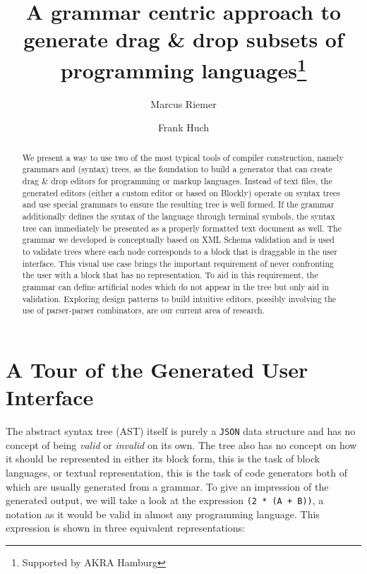 \documentclass[runningheads]{llncs}
\begin{document}
%
\title{A grammar centric approach to generate drag \& drop subsets of programming languages\thanks{Supported by AKRA Hamburg}}
%
%
\author{Marcus Riemer \and
Frank Huch}
%
%
%
\maketitle              %
%
\begin{abstract}
We present a way to use two of the most typical tools of compiler construction, namely grammars and (syntax) trees, as the foundation to build a generator that can create drag \& drop editors for programming or markup languages. Instead of text files, the generated editors (either a custom editor or based on Blockly) operate on syntax trees and use special grammars to ensure the resulting tree is well formed. If the grammar additionally defines the syntax of the language through terminal symbols, the syntax tree can immediately be presented as a properly formatted text document as well. The grammar we developed is conceptually based on XML Schema validation and is used to validate trees where each node corresponds to a block that is draggable in the user interface. This visual use case brings the important requirement of never confronting the user with a block that has no representation. To aid in this requirement, the grammar can define artificial nodes which do not appear in the tree but only aid in validation. Exploring design patterns to build intuitive editors, possibly involving the use of parser-parser combinators, are our current area of research.
\end{abstract}

\section{A Tour of the Generated User Interface}

The abstract syntax tree (AST) itself is purely a \texttt{JSON} data structure and has no concept of being \textit{valid} or \textit{invalid} on its own. The tree also has no concept on how it should be represented in either its block form, this is the task of block languages, or textual representation, this is the task of code generators both of which are usually generated from a grammar. To give an impression of the generated output, we will take a look at the expression \texttt{(2 * (A + B))}, a notation as it would be valid in almost any programming language. This expression is shown in three equivalent representations:
\end{document}
